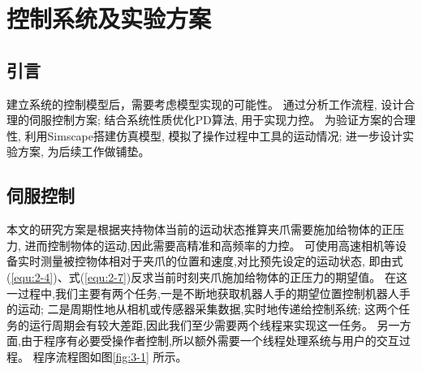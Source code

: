 \chapter{控制系统及实验方案}

\section{引言}
建立系统的控制模型后，需要考虑模型实现的可能性。
通过分析工作流程, 设计合理的伺服控制方案; 结合系统性质优化PD算法, 用于实现力控。
为验证方案的合理性, 利用Simscape搭建仿真模型, 模拟了操作过程中工具的运动情况;
进一步设计实验方案, 为后续工作做铺垫。

\section{伺服控制}
本文的研究方案是根据夹持物体当前的运动状态推算夹爪需要施加给物体的正压力,
进而控制物体的运动,因此需要高精准和高频率的力控。
可使用高速相机等设备实时测量被控物体相对于夹爪的位置和速度,对比预先设定的运动状态,
即由式(\ref{equ:2-4})、式(\ref{equ:2-7})反求当前时刻夹爪施加给物体的正压力的期望值。
在这一过程中,我们主要有两个任务,一是不断地获取机器人手的期望位置控制机器人手的运动;
二是周期性地从相机或传感器采集数据,实时地传递给控制系统;
这两个任务的运行周期会有较大差距,因此我们至少需要两个线程来实现这一任务。
另一方面,由于程序有必要受操作者控制,所以额外需要一个线程处理系统与用户的交互过程。
程序流程图如图\ref{fig:3-1} 所示。

